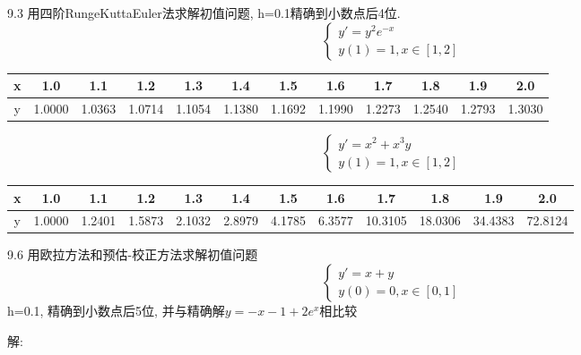 \documentclass[a4paper, 10pt]{article}
\begin{document}
\begin{CJK}{UTF8}{gbsn}
9.3
用四阶RungeKuttaEuler法求解初值问题, h=0.1精确到小数点后4位. \\
\begin{equation*}
	\begin{cases}
		y' = y^{2}e^{-x} \\
		y(1) = 1, x\in[1,2]
	\end{cases}
\end{equation*}

\begin{table}[h]
	\begin{tabular}{c|c c c c c c c c c c c}
		\hline
		x & 1.0 & 1.1 & 1.2 & 1.3 & 1.4 & 1.5 & 1.6 & 1.7 & 1.8 & 1.9 & 2.0 \\
		\hline
		y & 1.0000 & 1.0363 & 1.0714 & 1.1054 & 1.1380 & 1.1692 & 1.1990 & 1.2273 & 1.2540 & 1.2793 & 1.3030 \\
		\hline
	\end{tabular}
\end{table}

\begin{equation*}
	\begin{cases}
		y' = x^2+x^3y \\
		y(1) = 1, x \in [1,2]
	\end{cases}
\end{equation*}

\begin{table}[h]
	\begin{tabular}{c|c c c c c c c c c c c}
		\hline
		 x & 1.0 & 1.1 & 1.2 & 1.3 & 1.4 & 1.5 & 1.6 & 1.7 & 1.8 & 1.9 & 2.0 \\
		\hline
		y & 1.0000 & 1.2401 & 1.5873 & 2.1032 & 2.8979 & 4.1785 & 6.3577 & 10.3105 & 18.0306 & 34.4383 & 72.8124 \\
		\hline
	\end{tabular}
\end{table}


9.6
用欧拉方法和预估-校正方法求解初值问题
\begin{equation*}
	\begin{cases}
		y' = x+y \\
		y(0) = 0, x\in[0,1]
	\end{cases}
\end{equation*}
h=0.1, 精确到小数点后5位, 并与精确解$y=-x-1+2e^x$相比较

解:


\end{CJK}
\end{document}
